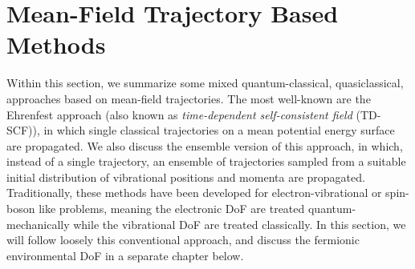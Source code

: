 \documentclass{article}
\begin{document}
\section{Mean-Field Trajectory Based Methods}
Within this section, we summarize some mixed quantum-classical, quasiclassical, approaches based on mean-field trajectories.
The most well-known are the Ehrenfest approach (also known as \emph{time-dependent self-consistent field} (TD-SCF)), in which single classical trajectories on a mean potential energy surface are propagated. We also discuss the ensemble version of this approach, in which, instead of a single trajectory, an ensemble of trajectories sampled from a suitable initial distribution of vibrational positions and momenta are propagated. 
Traditionally, these methods have been developed for electron-vibrational or spin-boson like problems, meaning the electronic DoF are treated quantum-mechanically while the vibrational DoF are treated classically. 
In this section, we will follow loosely this conventional approach, and discuss the fermionic environmental DoF in a separate chapter below.
\end{document}
